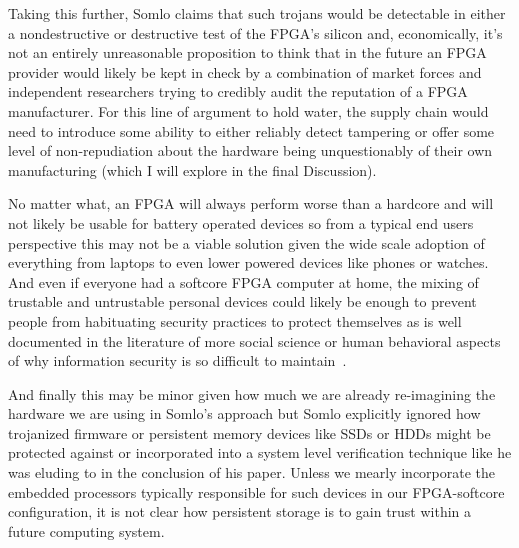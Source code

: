 \documentclass[conference]{IEEEtran}
\begin{document}
Taking this further, Somlo claims  that such trojans would be detectable in either a nondestructive or destructive test of the FPGA’s silicon and, economically, it’s not an entirely unreasonable proposition to think that in the future an FPGA provider would likely be kept in check by a combination of market forces and independent researchers trying to credibly audit the reputation of a FPGA manufacturer. For this line of argument to hold water, the supply chain would need to introduce some ability to either reliably detect tampering or offer some level of non-repudiation about the hardware being unquestionably of their own manufacturing (which I will explore in the final Discussion).

No matter what, an FPGA will always perform worse than a hardcore and will not likely be usable for battery operated devices so from a typical end users perspective this may not be a viable solution given the wide scale adoption of everything from laptops to even lower powered devices like phones or watches. And even if everyone had a softcore FPGA computer at home,  the mixing of trustable and untrustable personal devices could likely be enough to prevent people from habituating security practices to protect themselves as is well documented in the literature of more social science or human behavioral aspects of why information security is so difficult to maintain~\cite{anderson}.

And finally this may be minor given how much we are already re-imagining the hardware we are using in Somlo’s approach but Somlo explicitly ignored how trojanized firmware or persistent memory devices like SSDs or HDDs might be protected against or incorporated into a system level verification technique like he was eluding to in the conclusion of his paper. Unless we mearly incorporate the embedded processors typically responsible for such devices in our FPGA-softcore configuration, it is not clear how persistent storage is to gain trust within a future computing system.
\end{document}
